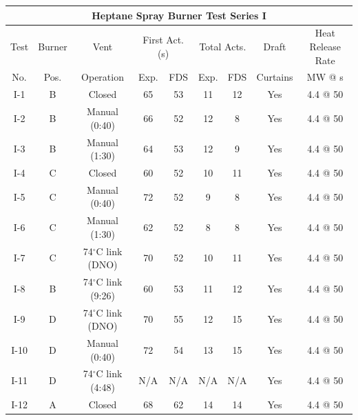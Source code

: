 \begin{table}[h]
\begin{center}
\begin{tabular}{|c||c|c|c|c|c|c|c|c|}
\hline
\multicolumn{9}{|c|}{\bf Heptane Spray Burner Test Series I}  \\ \hline \hline
Test & Burner & Vent                    & \multicolumn{2}{|c|}{First Act. (s) } & \multicolumn{2}{|c|}{Total Acts.}  & Draft    & Heat Release Rate \\ \cline{4-7}
No.  & Pos.   & Operation               & Exp. & FDS                            & Exp.  & FDS                        & Curtains & MW @ s \\
\hline \hline
I-1   & B  & Closed                     & 65   & 53                             & 11   & 12     & Yes  & 4.4 @ 50  \\ \hline
I-2   & B  & Manual (0:40)              & 66   & 52                             & 12   & 8      & Yes  & 4.4 @ 50  \\ \hline
I-3   & B  & Manual (1:30)              & 64   & 53                             & 12   & 9      & Yes  & 4.4 @ 50  \\ \hline
I-4   & C  & Closed                     & 60   & 52                             & 10   & 11     & Yes  & 4.4 @ 50  \\ \hline
I-5   & C  & Manual (0:40)              & 72   & 52                             & 9    & 8      & Yes  & 4.4 @ 50  \\ \hline
I-6   & C  & Manual (1:30)              & 62   & 52                             & 8    & 8      & Yes  & 4.4 @ 50  \\ \hline
I-7   & C  & 74$^\circ$C link (DNO)     & 70   & 52                             & 10   & 11     & Yes  & 4.4 @ 50  \\ \hline
I-8   & B  & 74$^\circ$C link (9:26)    & 60   & 53                             & 11   & 12     & Yes  & 4.4 @ 50  \\ \hline
I-9   & D  & 74$^\circ$C link (DNO)     & 70   & 55                             & 12   & 15     & Yes  & 4.4 @ 50  \\ \hline
I-10  & D  & Manual (0:40)              & 72   & 54                             & 13   & 15     & Yes  & 4.4 @ 50  \\ \hline
I-11  & D  & 74$^\circ$C link (4:48)    & N/A  & N/A                            & N/A  & N/A    & Yes  & 4.4 @ 50  \\ \hline
I-12  & A  & Closed                     & 68   & 62                             & 14   & 14     & Yes  & 4.4 @ 50  \\ \hline

\end{tabular}
\end{center}
\end{table}
